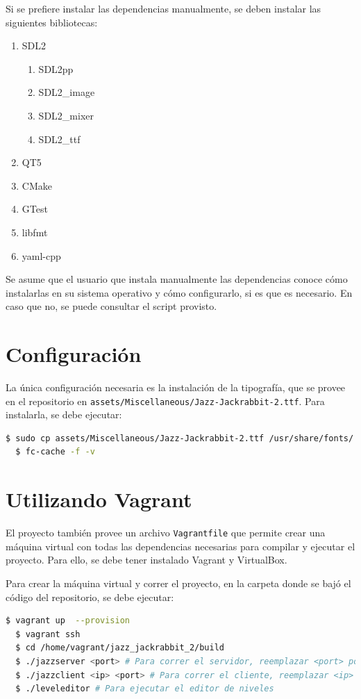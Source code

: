 \documentclass[titlepage,a4paper]{article}
\begin{document}
Si se prefiere instalar las dependencias manualmente, se deben instalar las siguientes bibliotecas:

\begin{enumerate}
  \item SDL2
  \begin{enumerate}
    \item SDL2pp
    \item SDL2\_image
    \item SDL2\_mixer
    \item SDL2\_ttf
  \end{enumerate}
  \item QT5
  \item CMake
  \item GTest
  \item libfmt
  \item yaml-cpp
\end{enumerate}

Se asume que el usuario que instala manualmente las dependencias conoce cómo instalarlas en su sistema operativo y cómo configurarlo, si es que es necesario. En caso que no, se puede consultar el script provisto.

\section{Configuración}
La única configuración necesaria es la instalación de la tipografía, que se provee en el repositorio en \texttt{assets/Miscellaneous/Jazz-Jackrabbit-2.ttf}. Para instalarla, se debe ejecutar:

\begin{lstlisting}[language=sh,caption=Instalación de la Tipografía, captionpos=b]
  $ sudo cp assets/Miscellaneous/Jazz-Jackrabbit-2.ttf /usr/share/fonts/
  $ fc-cache -f -v
\end{lstlisting}

\section{Utilizando Vagrant}
El proyecto también provee un archivo \texttt{Vagrantfile} que permite crear una máquina virtual con todas las dependencias necesarias para compilar y ejecutar el proyecto. Para ello, se debe tener instalado Vagrant y VirtualBox.

Para crear la máquina virtual y correr el proyecto, en la carpeta donde se bajó el código del repositorio, se debe ejecutar:

\begin{lstlisting}[language=sh,caption=Creación de la Máquina Virtual, captionpos=b]
  $ vagrant up  --provision
  $ vagrant ssh
  $ cd /home/vagrant/jazz_jackrabbit_2/build
  $ ./jazzserver <port> # Para correr el servidor, reemplazar <port> por un puerto a elección
  $ ./jazzclient <ip> <port> # Para correr el cliente, reemplazar <ip> por la IP del servidor (localhost) y <port> por el puerto
  $ ./leveleditor # Para ejecutar el editor de niveles
\end{lstlisting}
\end{document}
